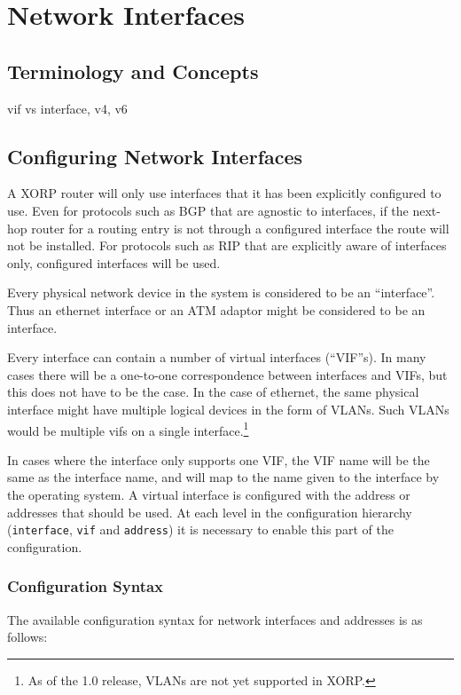 \chapter{Network Interfaces}

\section{Terminology and Concepts}

vif vs interface, v4, v6

\section{Configuring Network Interfaces}

A XORP router will only use interfaces that it has been explicitly
configured to use. Even for protocols such as BGP that are agnostic to
interfaces, if the next-hop router for a routing entry is not through
a configured interface the route will not be installed. For protocols
such as RIP that are explicitly aware of interfaces only, configured
interfaces will be used.

Every physical network device in the system is considered to be an
``interface''. Thus an ethernet interface or an ATM adaptor might be
considered to be an interface.  

Every interface can contain a number of virtual interfaces (``VIF''s).
In many cases there will be a one-to-one correspondence between
interfaces and VIFs, but this does not have to be the case.  In the
case of ethernet, the same physical interface might have multiple
logical devices in the form of VLANs.  Such VLANs would be multiple
vifs on a single interface.\footnote{As of the 1.0 release, VLANs are
not yet supported in XORP.}

In cases where the interface only supports one VIF, the VIF name will
be the same as the interface name, and will map to the name given to
the interface by the operating system.   A virtual interface is
configured with the address or addresses that should be used. At each
level in the configuration hierarchy ({\tt interface}, {\tt vif} and
{\tt address}) it is necessary to enable this part of the
configuration.

\subsection{Configuration Syntax}

The available configuration syntax for network interfaces and
addresses is as follows:

